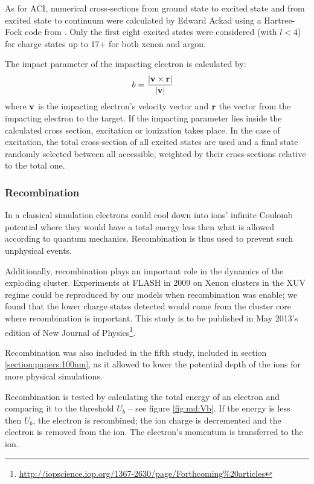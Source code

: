 As for ACI, numerical cross-sections from ground state to excited state and from
excited state to continuum were calculated by Edward Ackad using a
Hartree-Fock code from \cite{CowanCode}. Only the first eight excited states
were considered (with $l<4$) for charge states up to 17+ for both xenon and argon.

The impact parameter of the impacting electron is calculated by:
\begin{align}
b & = \frac{\left| \textbf{v} \times \textbf{r} \right|}{\left| \textbf{v} \right|}
\label{eqn:ionization:impact:parameter}
\end{align}
where $\textbf{v}$ is the impacting electron's velocity vector and $\textbf{r}$ the vector
from the impacting electron to the target. If the impacting parameter lies
inside the calculated cross section, excitation or ionization takes place. In
the case of excitation, the total cross-section of all excited states are used
and a final state randomly selected between all accessible, weighted by their
cross-sections relative to the total one.



\subsubsection{Recombination}
In a classical simulation electrons could cool down into ions' infinite Coulomb
potential where they would have a total energy less then what is allowed
according to quantum mechanics. Recombination is thus used to prevent such
unphysical events.

Additionally, recombination plays an important role in the dynamics of the
exploding cluster. Experiments at FLASH in 2009 on Xenon clusters in the XUV
regime\cite{Thomas2009} could be reproduced by our models when recombination
was enable; we found that the lower charge states detected would come from the
cluster core where recombination is important. This study is to be published in
May 2013's edition of New Journal of
Physics\footnote{\url{http://iopscience.iop.org/1367-2630/page/Forthcoming\%20articles}}.

Recombination was also included in the fifth study, included in section
\ref{section:papers:100nm}, as it allowed to lower the potential depth of the
ions for more physical simulations.

Recombination is tested by calculating the total energy of an electron and
comparing it to the threshold $U_b$ -- see figure \ref{fig:md:Vb}. If
the energy is less then $U_b$, the electron is recombined; the ion charge is
decremented and the electron is removed from the ion. The electron's momentum
is transferred to the ion.


